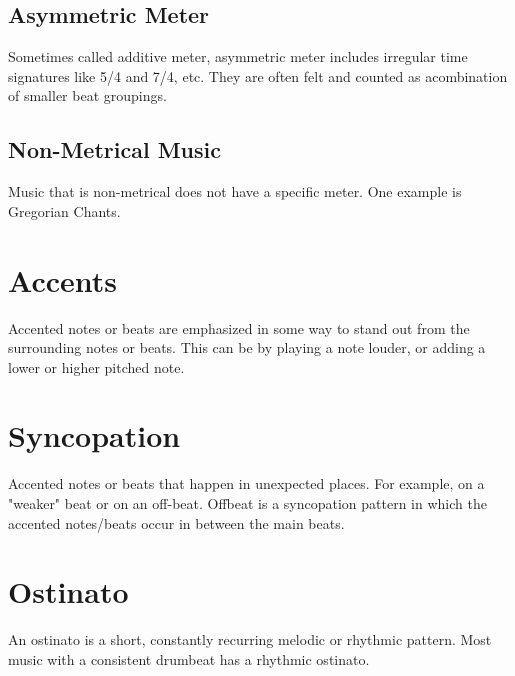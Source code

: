 \documentclass[12pt, a4paper]{report}
\begin{document}
  \subsection{Asymmetric Meter}

  Sometimes called additive meter, asymmetric meter includes irregular time signatures like 5/4 and 7/4, etc. They are often felt and counted as  acombination of smaller beat groupings.

  \subsection{Non-Metrical Music}

  Music that is non-metrical does not have a specific meter. One example is Gregorian Chants.

  \section{Accents}

  Accented notes or beats are emphasized in some way to stand out from the surrounding notes or beats. This can be by playing a note louder, or adding a lower or higher pitched note.

  \section{Syncopation}

  Accented notes or beats that happen in unexpected places. For example, on a "weaker" beat or on an off-beat. Offbeat is a syncopation pattern in which the accented notes/beats occur in between the main beats.

  \section{Ostinato}

  An ostinato is a short, constantly recurring melodic or rhythmic pattern. Most music with a consistent drumbeat has a rhythmic ostinato.
\end{document}
